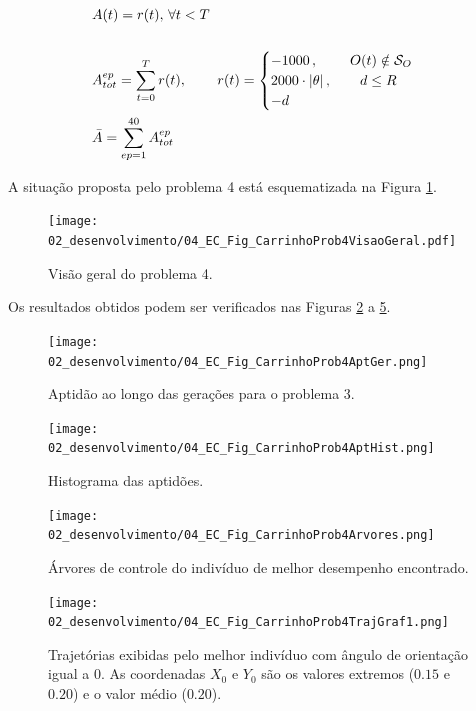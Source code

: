 \begin{align}\label{eq:4ec-carrinhoprob4aptidao}
	\begin{split}
		&A(t) = r(t),\,\forall t<T\\\\
		&A_{tot}^{ep} = \sum_{t=0}^{T} r(t),\,\qquad r(t) =  
			\begin{cases}
			-1000\,,\qquad\hspace{0.28em} O(t)\notin\mathcal{S}_O\\
			2000\cdot |\theta|\,,\qquad d\le R\\
			-d
			\end{cases}	\\
		&\bar{A} = \sum_{ep=1}^{40}A_{tot}^{ep}
	\end{split}
\end{align}

A situação proposta pelo problema 4 está esquematizada na Figura \ref{fig:4ec-carrinhoprob4visaogeral}.

\begin{figure}[H]
	\centering
	\texttt{[image: 02\_desenvolvimento/04\_EC\_Fig\_CarrinhoProb4VisaoGeral.pdf]}
	\caption{Visão geral do problema 4.}
	\label{fig:4ec-carrinhoprob4visaogeral}
\end{figure}

Os resultados obtidos podem ser verificados nas Figuras \ref{fig:4ec-carrinhoprob4aptger} a \ref{fig:4ec-carrinhoprob4trajgraf1}.

\begin{figure}[H]
	\centering
	\texttt{[image: 02\_desenvolvimento/04\_EC\_Fig\_CarrinhoProb4AptGer.png]}
	\caption{Aptidão ao longo das gerações para o problema 3.}
	\label{fig:4ec-carrinhoprob4aptger}
\end{figure}

\begin{figure}[H]
	\centering
	\texttt{[image: 02\_desenvolvimento/04\_EC\_Fig\_CarrinhoProb4AptHist.png]}
	\caption{Histograma das aptidões.}
	\label{fig:4ec-carrinhoprob4apthist}
\end{figure}

\begin{figure}[H]
	\centering
	\texttt{[image: 02\_desenvolvimento/04\_EC\_Fig\_CarrinhoProb4Arvores.png]}
	\caption{Árvores de controle do indivíduo de melhor desempenho encontrado.}
	\label{fig:4ec-carrinhoprob4arvores}
\end{figure}

\begin{figure}[H]
	\centering
	\texttt{[image: 02\_desenvolvimento/04\_EC\_Fig\_CarrinhoProb4TrajGraf1.png]}
	\caption{Trajetórias exibidas pelo melhor indivíduo com ângulo de orientação igual a $0$. As coordenadas $X_0$ e $Y_0$ são os valores extremos ($0.15$ e $0.20$) e o valor médio ($0.20$).}
	\label{fig:4ec-carrinhoprob4trajgraf1}
\end{figure}

